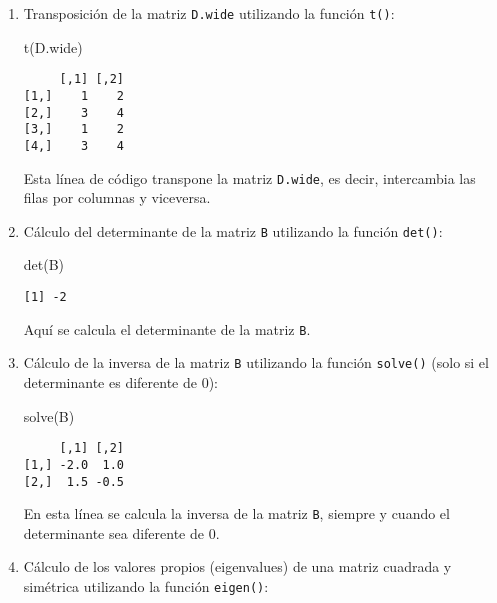 \documentclass[
  a4paper,
]{article}
\newenvironment{Shaded}{}{}
\newcommand{\FunctionTok}[1]{\textcolor[rgb]{0.44,0.26,0.76}{#1}}
\newcommand{\NormalTok}[1]{\textcolor[rgb]{0.14,0.16,0.18}{#1}}
\begin{document}
\begin{enumerate}
\def\labelenumi{\arabic{enumi}.}
\item
  Transposición de la matriz \texttt{D.wide} utilizando la función
  \texttt{t()}:

\begin{Shaded}
\begin{Highlighting}[]
\FunctionTok{t}\NormalTok{(D.wide)}
\end{Highlighting}
\end{Shaded}

\begin{verbatim}
     [,1] [,2]
[1,]    1    2
[2,]    3    4
[3,]    1    2
[4,]    3    4
\end{verbatim}

  Esta línea de código transpone la matriz \texttt{D.wide}, es decir,
  intercambia las filas por columnas y viceversa.
\item
  Cálculo del determinante de la matriz \texttt{B} utilizando la función
  \texttt{det()}:

\begin{Shaded}
\begin{Highlighting}[]
\FunctionTok{det}\NormalTok{(B)}
\end{Highlighting}
\end{Shaded}

\begin{verbatim}
[1] -2
\end{verbatim}

  Aquí se calcula el determinante de la matriz \texttt{B}.
\item
  Cálculo de la inversa de la matriz \texttt{B} utilizando la función
  \texttt{solve()} (solo si el determinante es diferente de 0):

\begin{Shaded}
\begin{Highlighting}[]
\FunctionTok{solve}\NormalTok{(B)}
\end{Highlighting}
\end{Shaded}

\begin{verbatim}
     [,1] [,2]
[1,] -2.0  1.0
[2,]  1.5 -0.5
\end{verbatim}

  En esta línea se calcula la inversa de la matriz \texttt{B}, siempre y
  cuando el determinante sea diferente de 0.
\item
  Cálculo de los valores propios (eigenvalues) de una matriz cuadrada y
  simétrica utilizando la función \texttt{eigen()}:


\end{enumerate}
\end{document}
